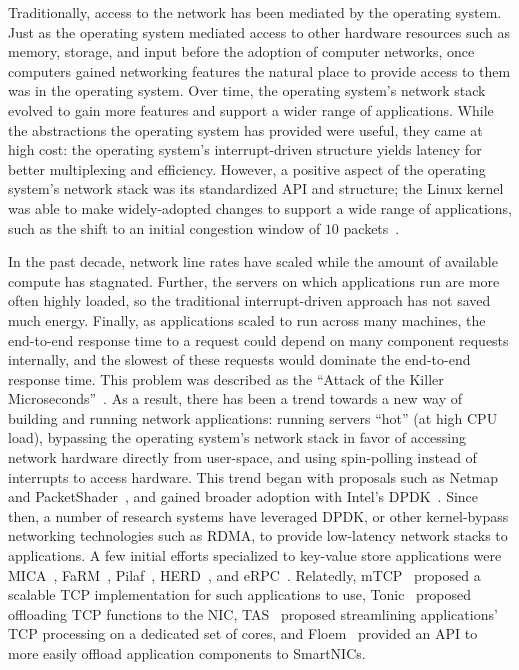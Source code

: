 Traditionally, access to the network has been mediated by the operating system. Just as the operating system mediated access to other hardware resources such as memory, storage, and input before the adoption of computer networks, once computers gained networking features the natural place to provide access to them was in the operating system.
Over time, the operating system's network stack evolved to gain more features and support a wider range of applications. While the abstractions the operating system has provided were useful, they came at high cost: the operating system's interrupt-driven structure yields latency for better multiplexing and efficiency.
However, a positive aspect of the operating system's network stack was its standardized API and structure; the Linux kernel was able to make widely-adopted changes to support a wide range of applications, such as the shift to an initial congestion window of $10$ packets~\cite{iw10}.

In the past decade, network line rates have scaled while the amount of available compute has stagnated. Further, the servers on which applications run are more often highly loaded, so the traditional interrupt-driven approach has not saved much energy. Finally, as applications scaled to run across many machines, the end-to-end response time to a request could depend on many component requests internally, and the slowest of these requests would dominate the end-to-end response time.
This problem was described as the ``Attack of the Killer Microseconds''~\cite{killer-microseconds}.
As a result, there has been a trend towards a new way of building and running network applications: running servers ``hot'' (\ie at high CPU load), bypassing the operating system's network stack in favor of accessing network hardware directly from user-space, and using spin-polling instead of interrupts to access hardware.
This trend began with proposals such as Netmap~\cite{netmap} and PacketShader~\cite{packetshader}, and gained broader adoption with Intel's DPDK~\cite{dpdk}.
Since then, a number of research systems have leveraged DPDK, or other kernel-bypass networking technologies such as RDMA, to provide low-latency network stacks to applications. A few initial efforts specialized to key-value store applications were MICA~\cite{mica}, FaRM~\cite{farm}, Pilaf~\cite{pilaf}, HERD~\cite{herd}, and eRPC~\cite{erpc}.
Relatedly, mTCP~\cite{mtcp} proposed a scalable TCP implementation for such applications to use, 
Tonic~\cite{tonic} proposed offloading TCP functions to the NIC,
TAS~\cite{tas} proposed streamlining applications' TCP processing on a dedicated set of cores,
and Floem~\cite{floem} provided an API to more easily offload application components to SmartNICs.


